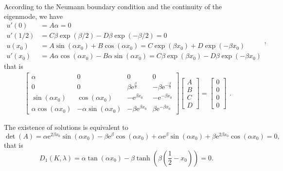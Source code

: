 \documentclass[a4paper,11pt]{article}
\begin{document}
\begin{appendices}
According to the Neumann boundary condition and the continuity of the eigenmode, we have
\begin{equation*}
\begin{split}
u'(0) & = A \alpha = 0 \\
u'(1/2) & = C \beta \exp(\beta/2) - D \beta \exp(-\beta/2) = 0 \\
u(x_0) & = A \sin(\alpha x_0) + B \cos(\alpha x_0) = C \exp(\beta x_0) + D \exp(-\beta x_0) \\
u'(x_0) & = A \alpha \cos(\alpha x_0) - B \alpha \sin(\alpha x_0) = C \beta \exp(\beta x_0) - D \beta \exp(-\beta x_0)
\end{split},
\end{equation*}
that is
\begin{equation*}
\begin{split}
\left[\begin{array}{cccc} \alpha & 0 & 0 & 0\\ 0 & 0 & \beta \mathrm{e}^{\frac{\beta}{2}} & - \beta \mathrm{e}^{-\frac{\beta}{2}}\\ \sin\!\left(\alpha x_0\right) & \cos\!\left(\alpha x_0\right) & - \mathrm{e}^{\beta x_0} & - \mathrm{e}^{- \beta x_0}\\ \alpha \cos\!\left(\alpha x_0\right) & - \alpha \sin\!\left(\alpha x_0\right) & - \beta \mathrm{e}^{\beta x_0} & \beta \mathrm{e}^{- \beta x_0} \end{array}\right]
\left[\begin{array}{c} A \\ B \\ C \\ D \end{array}\right]
=
\left[\begin{array}{c} 0 \\ 0 \\ 0 \\ 0 \end{array}\right]
\end{split}.
\end{equation*}

The existence of solutions is equivalent to
\begin{equation*}
\det(A) = \alpha \mathrm{e}^{2 \beta x_0} \sin\!\left(\alpha x_0\right) - \beta \mathrm{e}^{\beta} \cos\!\left(\alpha x_0\right) + \alpha \mathrm{e}^{\beta} \sin\!\left(\alpha x_0\right) + \beta \mathrm{e}^{2 \beta x_0} \cos\!\left(\alpha x_0\right) = 0,
\end{equation*}
that is
\begin{equation*}
D_1(K, \lambda) = \alpha \tan(\alpha x_0) - \beta \tanh(\beta (\frac12 - x_0)) = 0.
\end{equation*}


\end{appendices}
\end{document}
